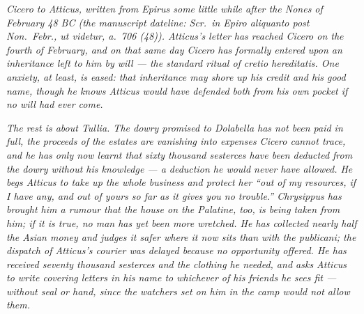 
\textit{Cicero to Atticus, written from Epirus some little
while after the Nones of February 48 BC (the manuscript
dateline: \textit{Scr.\ in Epiro aliquanto post Non.\ Febr.,
ut videtur, a.\ 706 (48)}). Atticus's letter has reached
Cicero on the fourth of February, and on that same day
Cicero has formally entered upon an inheritance left to him
by will --- the standard ritual of \textit{cretio
hereditatis}. One anxiety, at least, is eased: that
inheritance may shore up his credit and his good name,
though he knows Atticus would have defended both from his
own pocket if no will had ever come.}

\textit{The rest is about Tullia. The dowry promised to
Dolabella has not been paid in full, the proceeds of the
estates are vanishing into expenses Cicero cannot trace, and
he has only now learnt that sixty thousand sesterces have
been deducted from the dowry without his knowledge --- a
deduction he would never have allowed. He begs Atticus to
take up the whole business and protect her ``out of my
resources, if I have any, and out of yours so far as it
gives you no trouble.'' Chrysippus has brought him a rumour
that the house on the Palatine, too, is being taken from
him; if it is true, no man has yet been more wretched. He
has collected nearly half the Asian money and judges it
safer where it now sits than with the \textit{publicani};
the dispatch of Atticus's courier was delayed because no
opportunity offered. He has received seventy thousand
sesterces and the clothing he needed, and asks Atticus to
write covering letters in his name to whichever of his
friends he sees fit --- without seal or hand, since the
watchers set on him in the camp would not allow them.}
